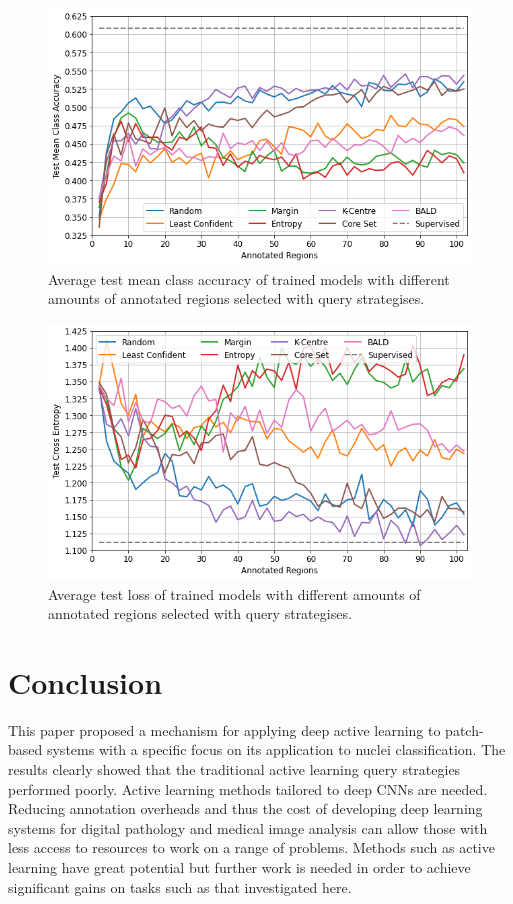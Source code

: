 \begin{figure}
	\centering
	\includegraphics[width=\textwidth]{images/active_learning_mean_class_accuracy.png}
	\caption{Average test mean class accuracy of trained models with different amounts of annotated regions selected with query strategises.}
	\label{fig:active_learning_mean_class_accuracy}
\end{figure}

\begin{figure}
	\centering
	\includegraphics[width=\textwidth]{images/active_learning_loss.png}
	\caption{Average test loss of trained models with different amounts of annotated regions selected with query strategises.}
	\label{fig:active_learning_loss}
\end{figure}


\section{Conclusion}
\label{sec:active_conclusion}
This paper proposed a mechanism for applying deep active learning to patch-based systems with a specific focus on its application to nuclei classification. The results clearly showed that the traditional active learning query strategies performed poorly. Active learning methods tailored to deep CNNs are needed. Reducing annotation overheads and thus the cost of developing deep learning systems for digital pathology and medical image analysis can allow those with less access to resources to work on a range of problems. Methods such as active learning have great potential but further work is needed in order to achieve significant gains on tasks such as that investigated here. 
